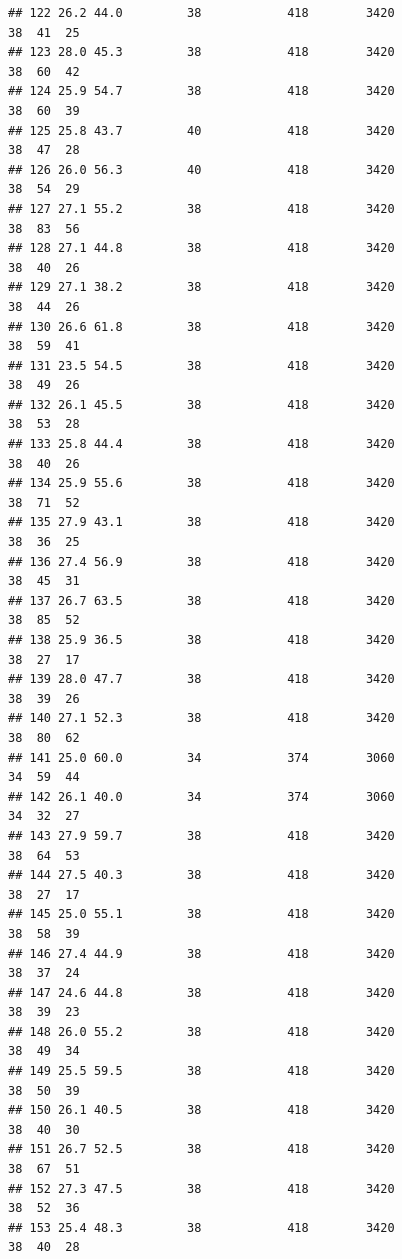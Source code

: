 \documentclass[
]{book}
\theoremstyle{definition}
\theoremstyle{definition}
\theoremstyle{definition}
\theoremstyle{definition}
\theoremstyle{remark}
\begin{document}
\begin{verbatim}
## 122 26.2 44.0         38            418        3420                  38  41  25
## 123 28.0 45.3         38            418        3420                  38  60  42
## 124 25.9 54.7         38            418        3420                  38  60  39
## 125 25.8 43.7         40            418        3420                  38  47  28
## 126 26.0 56.3         40            418        3420                  38  54  29
## 127 27.1 55.2         38            418        3420                  38  83  56
## 128 27.1 44.8         38            418        3420                  38  40  26
## 129 27.1 38.2         38            418        3420                  38  44  26
## 130 26.6 61.8         38            418        3420                  38  59  41
## 131 23.5 54.5         38            418        3420                  38  49  26
## 132 26.1 45.5         38            418        3420                  38  53  28
## 133 25.8 44.4         38            418        3420                  38  40  26
## 134 25.9 55.6         38            418        3420                  38  71  52
## 135 27.9 43.1         38            418        3420                  38  36  25
## 136 27.4 56.9         38            418        3420                  38  45  31
## 137 26.7 63.5         38            418        3420                  38  85  52
## 138 25.9 36.5         38            418        3420                  38  27  17
## 139 28.0 47.7         38            418        3420                  38  39  26
## 140 27.1 52.3         38            418        3420                  38  80  62
## 141 25.0 60.0         34            374        3060                  34  59  44
## 142 26.1 40.0         34            374        3060                  34  32  27
## 143 27.9 59.7         38            418        3420                  38  64  53
## 144 27.5 40.3         38            418        3420                  38  27  17
## 145 25.0 55.1         38            418        3420                  38  58  39
## 146 27.4 44.9         38            418        3420                  38  37  24
## 147 24.6 44.8         38            418        3420                  38  39  23
## 148 26.0 55.2         38            418        3420                  38  49  34
## 149 25.5 59.5         38            418        3420                  38  50  39
## 150 26.1 40.5         38            418        3420                  38  40  30
## 151 26.7 52.5         38            418        3420                  38  67  51
## 152 27.3 47.5         38            418        3420                  38  52  36
## 153 25.4 48.3         38            418        3420                  38  40  28

\end{verbatim}
\end{document}
